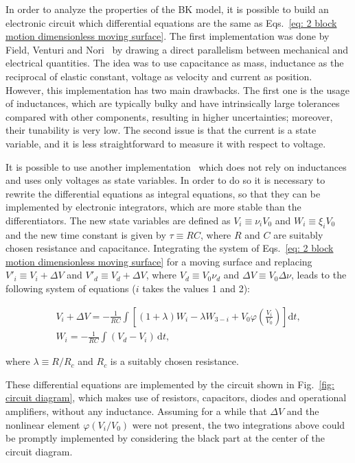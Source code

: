 In order to analyze the properties of the BK model, it is possible to build an electronic circuit
which differential equations are the same as Eqs.~\ref{eq: 2 block motion dimensionless moving surface}.
The first implementation was done by Field, Venturi and Nori~\cite{ref:fvn} by drawing a direct parallelism
between mechanical and electrical quantities. The idea was to use capacitance as mass,
inductance as the reciprocal of elastic constant, voltage as velocity and current as position.
However, this implementation has two main drawbacks. The first one is the usage of inductances, which are typically
bulky and have intrinsically large tolerances compared with other components, resulting in higher uncertainties; moreover,
their tunability is very low. The second issue is that the current is a state variable, and it is less straightforward
to measure it with respect to voltage.

It is possible to use another implementation~\cite{ref:electronic_analog} which does not rely on inductances
and uses only voltages as state variables. In order to do so it is necessary to rewrite the differential equations
as integral equations, so that they can be implemented by electronic integrators, which are more stable than
the differentiators. The new state variables are defined as $V_i\equiv \nu_i V_0$ and $W_i\equiv \xi_i V_0$ and
the new time constant is given by $\tau\equiv RC$, where $R$ and $C$ are suitably chosen resistance and capacitance.
Integrating the system of Eqs.~\ref{eq: 2 block motion dimensionless moving surface} for a moving surface and replacing
$V'_i\equiv V_i+\Delta V$ and $V'_d\equiv V_d+\Delta V$, where $V_d\equiv V_0\nu_d$ and $\Delta V\equiv V_0\Delta\nu$,
leads to the following system of equations ($i$ takes the values 1 and 2):

\begin{equation}
    \label{eq: 2 block motion electronic}
    \begin{gathered}
        V_i+\Delta V=-\frac{1}{RC}\int\left[ (1+\lambda)W_i - \lambda W_{3-i}+V_0\varphi\left(\frac{V_i}{V_0}\right) \right]\text{d}t ,\\[10pt]
        W_i=-\frac{1}{RC}\int(V_d-V_i)\,\text{d}t,
    \end{gathered}
\end{equation}

where $\lambda\equiv R/R_c$ and $R_c$ is a suitably chosen resistance.

These differential equations are implemented by the circuit shown in Fig.~\ref{fig: circuit diagram},
which makes use of resistors, capacitors, diodes and operational amplifiers, without any inductance.
Assuming for a while that $\Delta V$ and the nonlinear element $\varphi(V_i/V_0)$ were not present,
the two integrations above could be promptly implemented by considering the black part
at the center of the circuit diagram.

